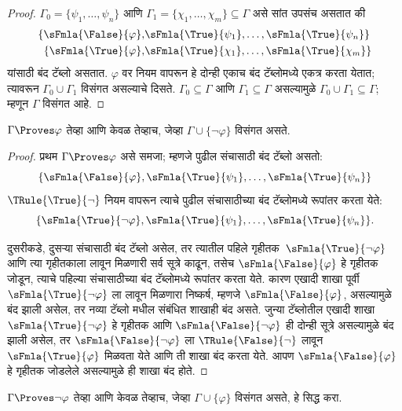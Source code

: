 \begin{proof}
$\Gamma_0 = \{\psi_1, \dots, \psi_n\}$ आणि $\Gamma_1
  =\{\chi_1, \dots, \chi_m\} \subseteq \Gamma$ असे सांत उपसंच असतात की
  \begin{align*}
    \{\sFmla{\False}{\varphi}, &
    \sFmla{\True}{\psi_1}, \dots, \sFmla{\True}{\psi_n}\} \\
    \{\sFmla{\True}{\varphi}, &
    \sFmla{\True}{\chi_1}, \dots, \sFmla{\True}{\chi_m}\}
  \end{align*}
  यांसाठी बंद टॅब्लो असतात. $\varphi$ वर \Cut{} नियम वापरून हे दोन्ही
  एकाच बंद टॅब्लोमध्ये एकत्र करता येतात; त्यावरून $\Gamma_0
  \cup \Gamma_1$ विसंगत असल्याचे दिसते. $\Gamma_0
  \subseteq \Gamma$ आणि $\Gamma_1 \subseteq \Gamma$ असल्यामुळे $\Gamma_0 \cup
  \Gamma_1 \subseteq \Gamma$; म्हणून $\Gamma$ विसंगत आहे.
\end{proof}

\begin{prop}
\label{fol:tab:prv:prop:prov-incons}
$\Gamma \Proves \varphi$ तेव्हा आणि केवळ तेव्हाच, जेव्हा $\Gamma \cup \{\lnot \varphi\}$
विसंगत असते.
\end{prop}

\begin{proof}
प्रथम $\Gamma \Proves \varphi$ असे समजा; म्हणजे पुढील संचासाठी बंद
टॅब्लो असतो:
\[\{\sFmla{\False}{\varphi},
\sFmla{\True}{\psi_1}, \dots, \sFmla{\True}{\psi_n}\}
\]
$\TRule{\True}{\lnot}$ नियम वापरून त्याचे पुढील संचासाठीच्या बंद
टॅब्लोमध्ये रूपांतर करता येते:
\[\{\sFmla{\True}{\lnot \varphi},
\sFmla{\True}{\psi_1}, \dots, \sFmla{\True}{\psi_n}\}.
\]

दुसरीकडे, दुसऱ्या संचासाठी बंद टॅब्लो असेल, तर त्यातील पहिले
गृहीतक~$\sFmla{\True}{\lnot \varphi}$ आणि त्या गृहीतकाला
\TRule{\True}{\lnot} लावून मिळणारी सर्व सूत्रे काढून, तसेच
$\sFmla{\False}{\varphi}$ हे गृहीतक जोडून, त्याचे पहिल्या संचासाठीच्या बंद
टॅब्लोमध्ये रूपांतर करता येते. कारण एखादी शाखा पूर्वी
$\sFmla{\True}{\lnot \varphi}$ ला \TRule{\True}{\lnot} लावून मिळणारा
निष्कर्ष, म्हणजे $\sFmla{\False}{\varphi}$, असल्यामुळे बंद झाली असेल, तर नव्या
टॅब्लो मधील संबंधित शाखाही बंद असते. जुन्या टॅब्लोतील एखादी शाखा
$\sFmla{\True}{\lnot \varphi}$ हे गृहीतक आणि $\sFmla{\False}{\lnot \varphi}$
ही दोन्ही सूत्रे असल्यामुळे बंद झाली असेल, तर $\sFmla{\False}{\lnot \varphi}$
ला $\TRule{\False}{\lnot}$ लावून $\sFmla{\True}{\varphi}$ मिळवता येते आणि
ती शाखा बंद करता येते. आपण $\sFmla{\False}{\varphi}$ हे गृहीतक जोडलेले
असल्यामुळे ही शाखा बंद होते.
\end{proof}

\begin{prob}
$\Gamma \Proves \lnot \varphi$ तेव्हा आणि केवळ तेव्हाच, जेव्हा $\Gamma \cup \{\varphi\}$
विसंगत असते, हे सिद्ध करा.
\end{prob}

